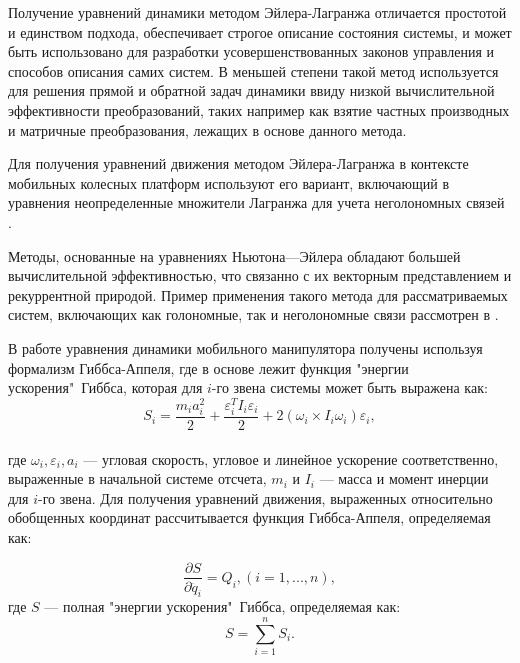 \documentclass[14pt, a4paper]{extreport}
\begin{document}
Получение уравнений динамики методом Эйлера-Лагранжа отличается простотой и единством подхода, обеспечивает строгое описание состояния системы, и может быть использовано для разработки усовершенствованных законов управления и способов описания самих систем. В меньшей степени такой метод используется для решения прямой и обратной задач динамики ввиду низкой вычислительной эффективности преобразований, таких например как взятие частных производных и матричные преобразования, лежащих в основе данного метода. 


Для получения уравнений движения методом Эйлера-Лагранжа в контексте мобильных колесных платформ используют его вариант, включающий в уравнения неопределенные множители Лагранжа для учета неголономных связей \cite{Adamov, Papad, Spyros, Zac}.

Методы, основанные на уравнениях Ньютона---Эйлера обладают большей вычислительной эффективностью, что связанно с их векторным представлением и рекуррентной природой. Пример применения такого метода для рассматриваемых систем, включающих как голономные, так и неголономные связи рассмотрен в \cite{Saha}.

В работе \cite{Korayem} уравнения динамики мобильного манипулятора получены используя формализм Гиббса-Аппеля, где в основе лежит функция "энергии ускорения"\ Гиббса, которая для $i$-го звена системы может быть выражена как:
\begin{equation}
S_i = \frac{m_i a_i^2}{2}  + \frac{\varepsilon_i^T I_i \varepsilon_i}{2}  + 2 (\omega_i \times I_i \omega_i) \varepsilon_i,
\end{equation}
\ \\
\noindent
где $\omega_i, \varepsilon_i, a_i$ --- угловая скорость, угловое и линейное ускорение соответственно, выраженные в начальной системе отсчета, $m_i$ и $I_i$ --- масса и момент инерции для $i$-го звена. Для получения уравнений движения, выраженных относительно обобщенных координат рассчитывается функция Гиббса-Аппеля, определяемая как:

\begin{equation}
\frac{\partial S}{\partial \ddot q_i} = Q_i, (i=1,...,n),
\end{equation}
\noindent
где $S$ --- полная "энергии ускорения"\ Гиббса, определяемая как:
\begin{equation}
S = \sum_{i=1}^n S_i.
\end{equation}
\end{document}
